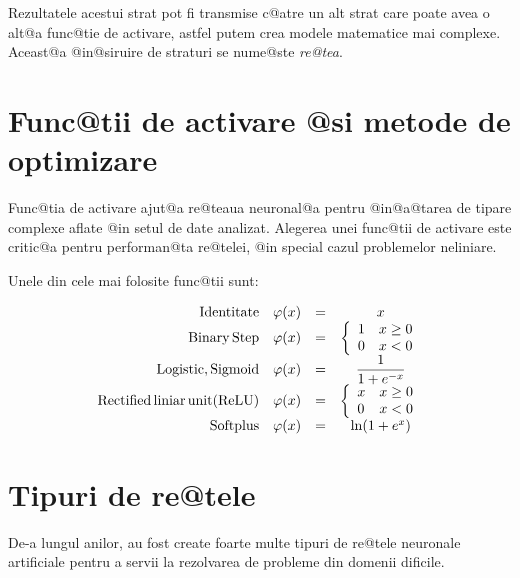Rezultatele acestui strat pot fi transmise c@atre un alt strat care poate avea o alt@a func@tie de activare, astfel putem crea modele matematice mai complexe. Aceast@a @in@siruire de straturi se nume@ste {\sl re@tea}.





\section{Func@tii de activare @si metode de optimizare}
Func@tia de activare ajut@a re@teaua neuronal@a pentru @in@a@tarea de tipare complexe aflate @in setul de date analizat. Alegerea unei func@tii de activare este critic@a pentru performan@ta re@telei, @in special cazul problemelor neliniare.

Unele din cele mai folosite func@tii sunt:

$$
\begin{array}{rlcc}
	{\rm Identitate} & \varphi (x) &=& x \\
	{\rm Binary \, Step} & \varphi (x) &=& \left\lbrace
		\begin{array}{lc}
			1 & x \geq 0 \\
			0 & x < 0
		\end{array}
	\right. \\
	{\rm Logistic, Sigmoid} & \varphi (x) &=& \displaystyle\frac{1}{1 + e^{-x}} \\
	{\rm Rectified\, liniar\, unit (ReLU)}& \varphi (x) &=& \left\lbrace
		\begin{array}{lc}
			x & x \geq 0 \\
			0 & x < 0
		\end{array}
	\right. \\
	{\rm Softplus} & \varphi (x) &=& \ln ( 1 + e^x) \\
\end{array}
$$



\section{Tipuri de re@tele}

De-a lungul anilor, au fost create foarte multe tipuri de re@tele neuronale artificiale pentru a servii la rezolvarea de probleme din domenii dificile.


